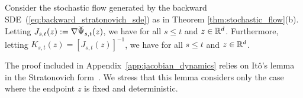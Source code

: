 \documentclass[twoside]{article}
\begin{document}
\begin{lemm} \label{lemm:jacobian_dynamics}
Consider the stochastic flow generated by the backward SDE~(\ref{eq:backward_stratonovich_sde}) as in Theorem \ref{thm:stochastic_flow}(b). Letting $J_{s,t} (z) := \nabla \widecheck{\Psi}_{s, t}(z)$, we have
for all $s \le t$ and $z \in \mathbb{R}^d$.
Furthermore, letting $K_{s, t}(z) = [J_{s, t}(z)]^{-1}$, we have
for all $s \le t$ and $z \in \mathbb{R}^d$.
\end{lemm}
The proof included in Appendix~\ref{app:jacobian_dynamics} relies on It\^o's lemma in the Stratonovich form~\cite[Theorem 2.4.1]{kunita2019stochastic}.
We stress that this lemma considers only the case where the endpoint $z$ is fixed and deterministic.
\end{document}
